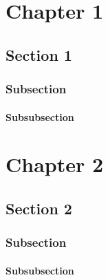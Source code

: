 \chapter{Chapter 1}\thispagestyle{fancy}
\section{Section 1}
\subsection{Subsection}
\subsubsection{Subsubsection}
\blindtext
\chapter{Chapter 2}\thispagestyle{fancy}
\section{Section 2}
\subsection{Subsection}
\subsubsection{Subsubsection}
\blindtext